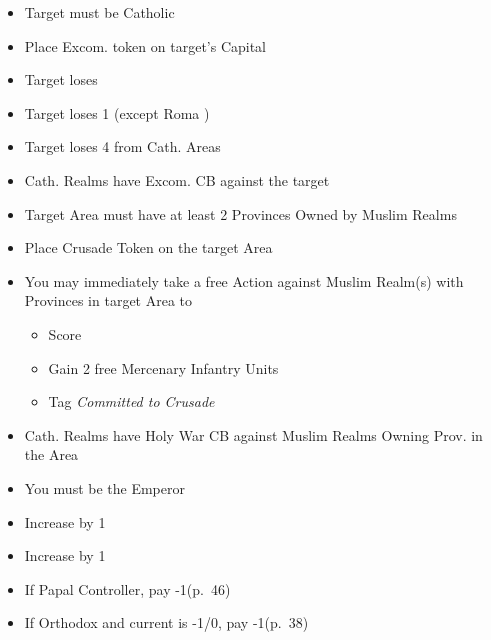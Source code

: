 \documentclass[10pt]{article}
\begin{document}
\begin{itemize}
	\item Target must be Catholic
	\item Place Excom. token on target's Capital
	\item Target loses 
	\item Target loses 1 \cardinal (except Roma \cardinal)
	\item Target loses 4 \influence from Cath. Areas
	\item Cath. Realms have Excom. CB against the target
\end{itemize}

\begin{itemize}
	\item Target Area must have at least 2 Provinces Owned by Muslim Realms
	\item Place Crusade Token on the target Area
	\item You may immediately take a free  Action against Muslim Realm(s) with Provinces in target Area to
	\begin{itemize}
		\item Score 
		\item Gain 2 free Mercenary Infantry Units
		\item Tag \emph{Committed to Crusade}
	\end{itemize}
	\item Cath. Realms have Holy War CB against Muslim Realms Owning Prov. in the Area	
\end{itemize}

\begin{itemize}
	\item You must be the Emperor
	\item Increase \authority by 1
\end{itemize}

\begin{itemize}
	\item Increase \stability by 1
	\item If Papal Controller, pay -1\adminpower (p.~46)
	\item If Orthodox and current \stability is -1/0, pay -1\adminpower (p.~38)
\end{itemize}
\end{document}
